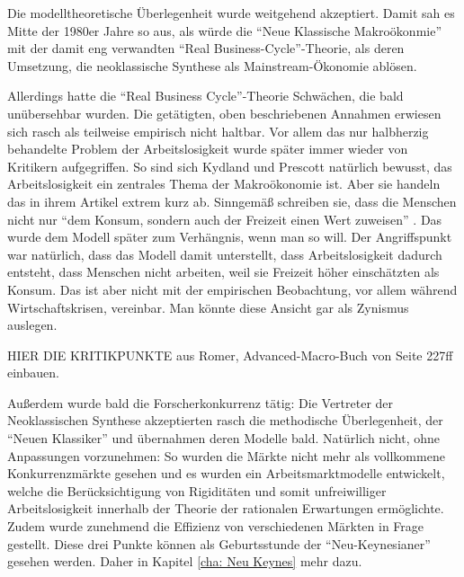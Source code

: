 Die modelltheoretische Überlegenheit wurde weitgehend akzeptiert. Damit sah es Mitte der 1980er Jahre so aus, als würde die "`Neue Klassische Makroökonmie"' mit der damit eng verwandten "`Real Business-Cycle"'-Theorie, als deren Umsetzung,  die neoklassische Synthese als Mainstream-Ökonomie ablösen.

Allerdings hatte die "`Real Business Cycle"'-Theorie Schwächen, die bald unübersehbar wurden. Die getätigten, oben beschriebenen Annahmen erwiesen sich rasch als teilweise empirisch nicht haltbar. 
Vor allem das nur halbherzig behandelte Problem der Arbeitslosigkeit wurde später immer wieder von Kritikern aufgegriffen. So sind sich Kydland und Prescott natürlich bewusst, das Arbeitslosigkeit ein zentrales Thema der Makroökonomie ist. Aber sie handeln das in ihrem Artikel extrem kurz ab. Sinngemäß schreiben sie, dass die Menschen nicht nur "`dem Konsum, sondern auch der Freizeit einen Wert zuweisen"' \parencite[S. 1345]{Kydland1982}. Das wurde dem Modell später zum Verhängnis, wenn man so will. Der Angriffspunkt war natürlich, dass das Modell damit unterstellt, dass Arbeitslosigkeit dadurch entsteht, dass Menschen nicht arbeiten, weil sie Freizeit höher einschätzten als Konsum.
Das ist aber nicht mit der empirischen Beobachtung, vor allem während Wirtschaftskrisen, vereinbar. Man könnte diese Ansicht gar als Zynismus auslegen.

HIER DIE KRITIKPUNKTE aus Romer, Advanced-Macro-Buch von Seite 227ff einbauen.

Außerdem wurde bald die Forscherkonkurrenz tätig: Die Vertreter der Neoklassischen Synthese akzeptierten rasch die methodische Überlegenheit, der "`Neuen Klassiker"' und übernahmen deren Modelle bald. Natürlich nicht, ohne Anpassungen vorzunehmen: So wurden die Märkte nicht mehr als vollkommene Konkurrenzmärkte gesehen und es wurden ein Arbeitsmarktmodelle entwickelt, welche die Berücksichtigung von Rigiditäten und somit unfreiwilliger Arbeitslosigkeit innerhalb der Theorie der rationalen Erwartungen ermöglichte. Zudem wurde zunehmend die Effizienz von verschiedenen Märkten in Frage gestellt. Diese drei Punkte können als Geburtsstunde der "`Neu-Keynesianer"' gesehen werden. Daher in Kapitel \ref{cha: Neu Keynes} mehr dazu.


